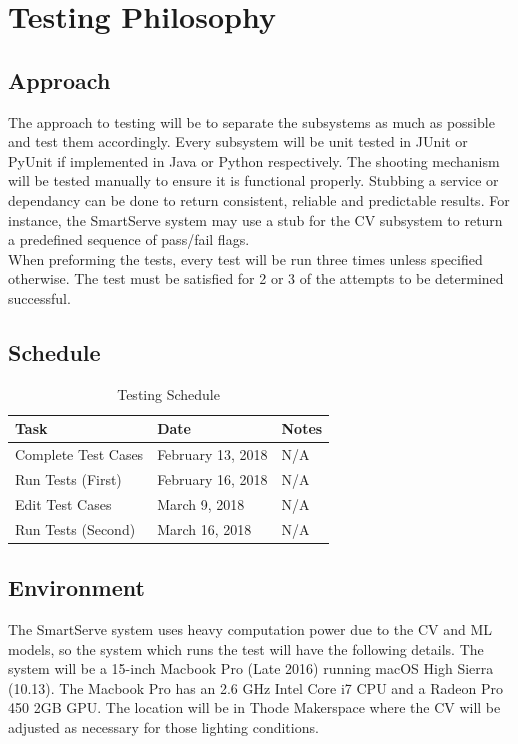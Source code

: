 \documentclass[11pt]{article}
\begin{document}
\section{Testing Philosophy}
\subsection{Approach}
The approach to testing will be to separate the subsystems as much as possible and test them accordingly. Every subsystem will be unit tested in JUnit or PyUnit if implemented in Java or Python respectively. The shooting mechanism will be tested manually to ensure it is functional properly. Stubbing a service or dependancy can be done to return consistent, reliable and predictable results. For instance, the SmartServe system may use a stub for the CV subsystem to return a predefined sequence of pass/fail flags. \\
When preforming the tests, every test will be run three times unless specified otherwise. The test must be satisfied for 2 or 3 of the attempts to be determined successful.
\subsection{Schedule}
\begin{table}[H]
\centering
\label{my-label}
\begin{tabular}{|l|l|l|}
\hline
\textbf{Task} & \textbf{Date} & \textbf{Notes} \\ \hline
Complete Test Cases & February 13, 2018 & N/A \\ \hline
Run Tests (First) & February 16, 2018 & N/A \\ \hline
Edit Test Cases & March 9, 2018 & N/A \\ \hline
Run Tests (Second) & March 16, 2018 & N/A \\ \hline
\end{tabular}
\caption{Testing Schedule}
\end{table}
\subsection{Environment}
The SmartServe system uses heavy computation power due to the CV and ML models, so the system which runs the test will have the following details. The system will be a 15-inch Macbook Pro (Late 2016) running macOS High Sierra (10.13). The Macbook Pro has an 2.6 GHz Intel Core i7 CPU and a Radeon Pro 450 2GB GPU. The location will be in Thode Makerspace where the CV will be adjusted as necessary for those lighting conditions.
\end{document}
